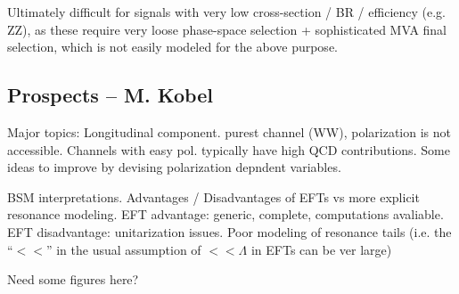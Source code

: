 Ultimately difficult for signals with very low cross-section / BR / efficiency (e.g. ZZ), as these require very loose phase-space selection + sophisticated MVA final selection, which is not easily modeled for the above purpose.

\subsection{Prospects -- M. Kobel}

Major topics:
Longitudinal component.
purest channel (WW), polarization is not accessible. Channels with easy pol. typically have high QCD contributions.
Some ideas to improve by devising polarization depndent variables.

BSM interpretations.
Advantages / Disadvantages of EFTs vs more explicit resonance modeling.
EFT advantage: generic, complete, computations avaliable.
EFT disadvantage: unitarization issues. Poor modeling of resonance tails (i.e. the ``$<<$'' in the usual assumption of $<<\Lambda$ in EFTs can be ver large)

Need some figures here?
